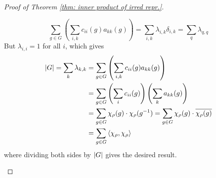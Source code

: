 \begin{proof}[Proof of Theorem \ref{thm: inner product of irred repr.}]
\begin{itemize}
        \[
            \sum_{g \in G} \left( \sum_{i, k} c_{ii}(g) a_{kk}(g) \right) = \sum_{i, k} \lambda_{i, k} \delta_{i, k} = \sum_{q} \lambda_{q, q}
        \]
        But $\lambda_{i, i} = 1$ for all $i$, which gives
        \begin{align*}
            \left|G\right| = \sum_{k} \lambda_{k, k}
            & = \sum_{g \in G} \left( \sum_{i, k} c_{ii}(g) a_{kk}(g) \right) \\
            & = \sum_{g \in G} \left( \sum_{i} c_{ii}(g) \right) \left( \sum_k a_{kk}(g) \right) \\
            & = \sum_{g \in G} \chi_{\rho}(g) \cdot \chi_{\rho}(g^{-1}) = \sum_{g \in G} \chi_{\rho}(g) \cdot \overline{\chi_{\rho}(g)} \\
            & = \sum_{g \in G} \left\langle \chi_{\rho}, \chi_{\rho} \right\rangle
        \end{align*}
        where dividing both sides by $\left|G\right|$ gives the desired result.
    \end{itemize}
\end{proof}

